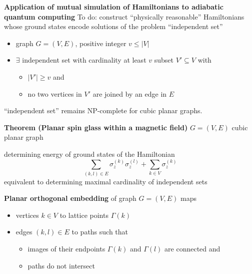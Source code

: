 \documentclass[portrait]{seminar}
\begin{document}
\begin{slide}
{\bf Application of mutual simulation of Hamiltonians to adiabatic quantum
computing}
\vfill
To do: construct {\red ``physically reasonable''} Hamiltonians whose ground 
states encode solutions of the problem ``independent set''
\begin{itemize}
\item graph $G=(V,E)$, positive integer $v\le |V|$
\item {\large $\exists$} independent set with cardinality at least $v$
\vfill 
subset $V'\subseteq V$ with 
\begin{itemize}
\item $|V'|\ge v$ and 
\item no two vertices in $V'$ are joined by an edge in $E$
\end{itemize}
\end{itemize}
\vfill
``independent set'' remains NP-complete for {\blue cubic planar} graphs.
\vfill
\end{slide}

\begin{slide}
{\bf Theorem (Planar spin glass within a magnetic field)}
\vfill
$G=(V,E)$ cubic planar graph 

determining {\blue energy of ground states} of the Hamiltonian
\[
\sum_{(k,l)\in E} \sigma_z^{(k)}\sigma_z^{(l)} + \sum_{k\in V}
\sigma_z^{(k)}
\]
equivalent to determining {\blue maximal cardinality of independent
sets}

\end{slide}

\begin{slide}
{\bf Planar orthogonal embedding} of graph $G=(V,E)$ maps

\begin{itemize}
\item vertices $k\in V$ to lattice points $\Gamma(k)$  
\item edges $(k,l)\in E$ to paths such that 
\begin{itemize}
\item images of their endpoints $\Gamma(k)$ and $\Gamma(l)$ are 
connected and 
\item paths do not intersect
\end{itemize}
\end{itemize}
\hspace{2cm}
\textwidth{}
\vfill
\end{slide}
\end{document}

